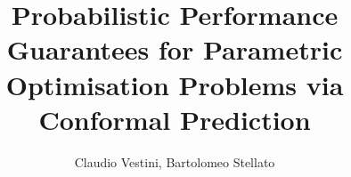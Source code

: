 \documentclass{article}
\begin{document}
\title{Probabilistic Performance Guarantees for Parametric Optimisation Problems via Conformal Prediction}
\author{Claudio Vestini, Bartolomeo Stellato}


\maketitle






\printbibliography
\end{document}
